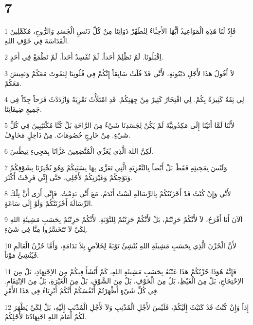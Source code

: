 \chapter{7}

\par 1 فَإِذْ لَنَا هَذِهِ الْمَوَاعِيدُ أَيُّهَا الأَحِبَّاءُ لِنُطَهِّرْ ذَوَاتِنَا مِنْ كُلِّ دَنَسِ الْجَسَدِ وَالرُّوحِ، مُكَمِّلِينَ الْقَدَاسَةَ فِي خَوْفِ اللهِ.
\par 2 اِقْبَلُونَا. لَمْ نَظْلِمْ أَحَداً. لَمْ نُفْسِدْ أَحَداً. لَمْ نَطْمَعْ فِي أَحَدٍ.
\par 3 لاَ أَقُولُ هَذَا لأَجْلِ دَيْنُونَةٍ، لأَنِّي قَدْ قُلْتُ سَابِقاً إِنَّكُمْ فِي قُلُوبِنَا لِنَمُوتَ مَعَكُمْ وَنَعِيشَ مَعَكُمْ.
\par 4 لِي ثِقَةٌ كَثِيرَةٌ بِكُمْ. لِي افْتِخَارٌ كَثِيرٌ مِنْ جِهَتِكُمْ. قَدِ امْتَلَأْتُ تَعْزِيَةً وَازْدَدْتُ فَرَحاً جِدّاً فِي جَمِيعِ ضِيقَاتِنَا.
\par 5 لأَنَّنَا لَمَّا أَتَيْنَا إِلَى مَكِدُونِيَّةَ لَمْ يَكُنْ لِجَسَدِنَا شَيْءٌ مِنَ الرَّاحَةِ بَلْ كُنَّا مُكْتَئِبِينَ فِي كُلِّ شَيْءٍ. مِنْ خَارِجٍ خُصُومَاتٌ. مِنْ دَاخِلٍ مَخَاوِفُ.
\par 6 لَكِنَّ اللهَ الَّذِي يُعَزِّي الْمُتَّضِعِينَ عَزَّانَا بِمَجِيءِ تِيطُسَ.
\par 7 وَلَيْسَ بِمَجِيئِهِ فَقَطْ بَلْ أَيْضاً بِالتَّعْزِيَةِ الَّتِي تَعَزَّى بِهَا بِسَبَبِكُمْ وَهُوَ يُخْبِرُنَا بِشَوْقِكُمْ وَنَوْحِكُمْ وَغَيْرَتِكُمْ لأَجْلِي، حَتَّى إِنِّي فَرِحْتُ أَكْثَرَ.
\par 8 لأَنِّي وَإِنْ كُنْتُ قَدْ أَحْزَنْتُكُمْ بِالرِّسَالَةِ لَسْتُ أَنْدَمُ، مَعَ أَنِّي نَدِمْتُ. فَإِنِّي أَرَى أَنَّ تِلْكَ الرِّسَالَةَ أَحْزَنَتْكُمْ وَلَوْ إِلَى سَاعَةٍ.
\par 9 اَلآنَ أَنَا أَفْرَحُ، لاَ لأَنَّكُمْ حَزِنْتُمْ، بَلْ لأَنَّكُمْ حَزِنْتُمْ لِلتَّوْبَةِ. لأَنَّكُمْ حَزِنْتُمْ بِحَسَبِ مَشِيئَةِ اللهِ لِكَيْ لاَ تَتَخَسَّرُوا مِنَّا فِي شَيْءٍ.
\par 10 لأَنَّ الْحُزْنَ الَّذِي بِحَسَبِ مَشِيئَةِ اللهِ يُنْشِئُ تَوْبَةً لِخَلاَصٍ بِلاَ نَدَامَةٍ، وَأَمَّا حُزْنُ الْعَالَمِ فَيُنْشِئُ مَوْتاً.
\par 11 فَإِنَّهُ هُوَذَا حُزْنُكُمْ هَذَا عَيْنُهُ بِحَسَبِ مَشِيئَةِ اللهِ، كَمْ أَنْشَأَ فِيكُمْ مِنَ الاِجْتِهَادِ، بَلْ مِنَ الاِحْتِجَاجِ، بَلْ مِنَ الْغَيْظِ، بَلْ مِنَ الْخَوْفِ، بَلْ مِنَ الشَّوْقِ، بَلْ مِنَ الْغَيْرَةِ، بَلْ مِنَ الاِنْتِقَامِ. فِي كُلِّ شَيْءٍ أَظْهَرْتُمْ أَنْفُسَكُمْ أَنَّكُمْ أَبْرِيَاءُ فِي هَذَا الأَمْرِ.
\par 12 إِذاً وَإِنْ كُنْتُ قَدْ كَتَبْتُ إِلَيْكُمْ، فَلَيْسَ لأَجْلِ الْمُذْنِبِ وَلاَ لأَجْلِ الْمُذْنَبِ إِلَيْهِ، بَلْ لِكَيْ يَظْهَرَ لَكُمْ أَمَامَ اللهِ اجْتِهَادُنَا لأَجْلِكُمْ.
